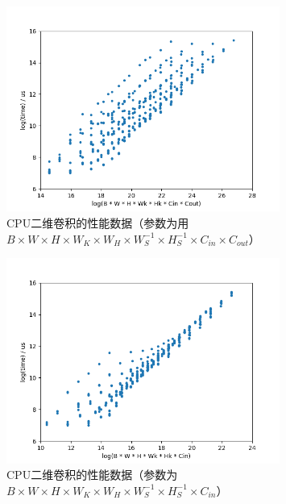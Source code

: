     \begin{figure}[!htbp]
        \centering
        \includegraphics[width=0.8\textwidth]{figures/conv_cpu.png}
        \caption{CPU二维卷积的性能数据（参数为用$ B \times W \times H \times W_K \times W_H \times W_S^{-1} \times H_S^{-1} \times C_{in} \times C_{out} $）}
        \label{fig:conv_cpu}
    \end{figure}

    \begin{figure}[!htbp]
        \centering
        \includegraphics[width=0.8\textwidth]{figures/conv_cpu_fix0.png}
        \caption{CPU二维卷积的性能数据（参数为$ B \times W \times H \times W_K \times W_H \times W_S^{-1} \times H_S^{-1} \times C_{in}  $）}
        \label{fig:conv_cpu_fix0}
    \end{figure}

